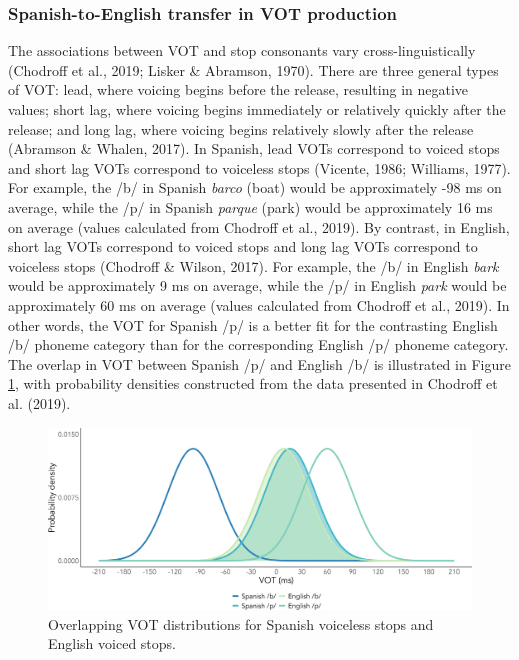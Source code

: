 \documentclass[
  12pt,
  twoside]{article}
\begin{document}
\hypertarget{spanish-to-english-transfer-in-vot-production}{%
\subsubsection{Spanish-to-English transfer in VOT production}\label{spanish-to-english-transfer-in-vot-production}}

The associations between VOT and stop consonants vary cross-linguistically (Chodroff et al., 2019; Lisker \& Abramson, 1970).
There are three general types of VOT: lead, where voicing begins before the release, resulting in negative values; short lag, where voicing begins immediately or relatively quickly after the release; and long lag, where voicing begins relatively slowly after the release (Abramson \& Whalen, 2017).
In Spanish, lead VOTs correspond to voiced stops and short lag VOTs correspond to voiceless stops (Vicente, 1986; Williams, 1977).
For example, the /b/ in Spanish \emph{barco} (boat) would be approximately -98 ms on average, while the /p/ in Spanish \emph{parque} (park) would be approximately 16 ms on average (values calculated from Chodroff et al., 2019).
By contrast, in English, short lag VOTs correspond to voiced stops and long lag VOTs correspond to voiceless stops (Chodroff \& Wilson, 2017).
For example, the /b/ in English \emph{bark} would be approximately 9 ms on average, while the /p/ in English \emph{park} would be approximately 60 ms on average (values calculated from Chodroff et al., 2019).
In other words, the VOT for Spanish /p/ is a better fit for the contrasting English /b/ phoneme category than for the corresponding English /p/ phoneme category.
The overlap in VOT between Spanish /p/ and English /b/ is illustrated in Figure \ref{fig:intro-fig}, with probability densities constructed from the data presented in Chodroff et al. (2019).

\begin{figure}[H]

{\centering \includegraphics[width=\textwidth]{sections/code/outputs/l1_plot} 

}

\caption{Overlapping VOT distributions for Spanish voiceless stops and English voiced stops.}\label{fig:intro-fig}
\end{figure}
\end{document}
